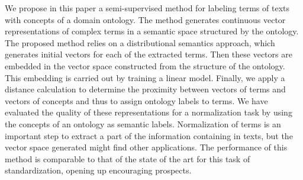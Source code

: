 We propose in this paper a semi-supervised method for labeling terms of texts with concepts of a domain ontology. The method generates continuous vector representations of complex terms in a semantic space structured by the ontology. The proposed method relies on a distributional semantics approach, which generates initial vectors for each of the extracted terms. Then these vectors are embedded in the vector space constructed from the structure of the ontology. This embedding is carried out by training a linear model. Finally, we apply a distance calculation to determine the proximity between vectors of terms and vectors of concepts and thus to assign ontology labels to terms. We have evaluated the quality of these representations for a normalization task by using the concepts of an ontology as semantic labels. Normalization of terms is an important step to extract a part of the information containing in texts, but the vector space generated might find other applications. The performance of this method is comparable to that of the state of the art for this task of standardization, opening up encouraging prospects.
